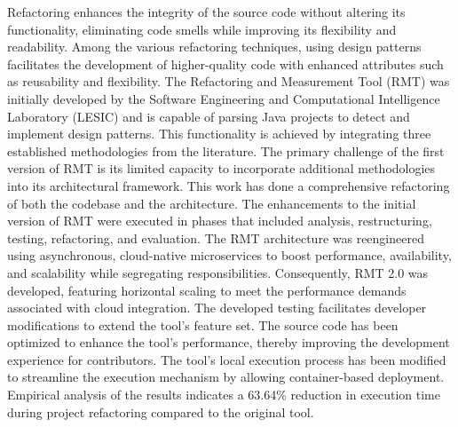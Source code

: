 \begin{Abstract}[english]%
Refactoring enhances the integrity of the source code without altering its functionality, eliminating code smells while improving its flexibility and readability. Among the various refactoring techniques, using design patterns facilitates the development of higher-quality code with enhanced attributes such as reusability and flexibility. The Refactoring and Measurement Tool (RMT) was initially developed by the Software Engineering and Computational Intelligence Laboratory (LESIC) and is capable of parsing Java projects to detect and implement design patterns. This functionality is achieved by integrating three established methodologies from the literature. The primary challenge of the first version of RMT is its limited capacity to incorporate additional methodologies into its architectural framework. This work has done a comprehensive refactoring of both the codebase and the architecture. The enhancements to the initial version of RMT were executed in phases that included analysis, restructuring, testing, refactoring, and evaluation. The RMT architecture was reengineered using asynchronous, cloud-native microservices to boost performance, availability, and scalability while segregating responsibilities. Consequently, RMT 2.0 was developed, featuring horizontal scaling to meet the performance demands associated with cloud integration. The developed testing facilitates developer modifications to extend the tool's feature set.  The source code has been optimized to enhance the tool's performance, thereby improving the development experience for contributors. The tool's local execution process has been modified to streamline the execution mechanism by allowing container-based deployment. Empirical analysis of the results indicates a 63.64\% reduction in execution time during project refactoring compared to the original tool.
\end{Abstract}
